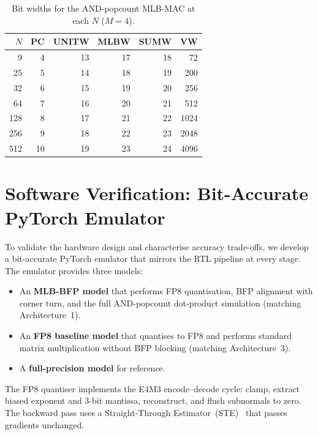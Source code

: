 \documentclass[conference]{IEEEtran}
\begin{document}
\begin{table}[htbp]
\centering
\caption{Bit widths for the AND-popcount MLB-MAC at each $N$ ($M=4$).}
\label{tab:bitwidths}
\footnotesize
\begin{tabular}{rrrrrr}
\toprule
$N$ & PC & UNITW & MLBW & SUMW & VW \\
\midrule
9   & 4  & 13   & 17  & 18  & 72  \\
25  & 5  & 14   & 18  & 19  & 200 \\
32  & 6  & 15   & 19  & 20  & 256 \\
64  & 7  & 16   & 20  & 21  & 512 \\
128 & 8  & 17   & 21  & 22  & 1024 \\
256 & 9  & 18   & 22  & 23  & 2048 \\
512 & 10 & 19   & 23  & 24  & 4096 \\
\bottomrule
\end{tabular}
\end{table}

\section{Software Verification: Bit-Accurate PyTorch Emulator}
\label{sec:pytorch}

To validate the hardware design and characterise accuracy
trade-offs, we develop a bit-accurate PyTorch emulator that
mirrors the RTL pipeline at every stage.  The emulator
provides three models:

\begin{itemize}
    \item An \textbf{MLB-BFP model} that performs FP8 quantisation,
    BFP alignment with corner turn, and the full AND-popcount
    dot-product simulation (matching Architecture~1).
    \item An \textbf{FP8 baseline model} that quantises to FP8
    and performs standard matrix multiplication without BFP
    blocking (matching Architecture~3).
    \item A \textbf{full-precision model} for reference.
\end{itemize}

The FP8 quantiser implements the E4M3 encode--decode cycle: clamp,
extract biased exponent and 3-bit mantissa, reconstruct, and flush
subnormals to zero.  The backward pass uses a Straight-Through
Estimator~(STE)~\cite{b_ste} that passes gradients unchanged.
\end{document}
